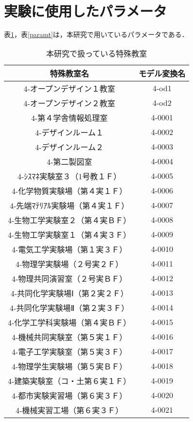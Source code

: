 \section{実験に使用したパラメータ}
\label{hurokupara}
表\ref{tokushu}，表\ref{paramt}は，本研究で用いているパラメータである．
\begin{table}[!h]
\begin{center}
\caption{本研究で扱っている特殊教室}
\label{tokushu}
\begin{tabular}{|c|c|}
\hline
特殊教室名 & モデル変換名\\
\hline\hline
4-オープンデザイン１教室          &   4-od1 \\
4-オープンデザイン２教室          &   4-od2 \\
4-第４学舎情報処理室              &   4-0001\\
4-デザインルーム１                &   4-0002\\
4-デザインルーム２                &   4-0003\\
4-第二製図室                      &   4-0004\\
4-ｼｽﾏﾈ実験室３（1号教１Ｆ）       &   4-0005\\
4-化学物質実験場（第４実１Ｆ）    &   4-0006\\
4-先端ﾏﾃﾘｱﾙ実験場（第４実１Ｆ）   &   4-0007\\
4-生物工学実験室２（第４実ＢＦ）  &   4-0008\\
4-生物工学実験室１（第４実３Ｆ）  &   4-0009\\
4-電気工学実験場（第１実３Ｆ）    &   4-0010\\
4-物理学実験場（２号実２Ｆ）      &   4-0011\\
4-物理共同演習室（２号実ＢＦ）    &   4-0012\\
4-共同化学実験場Ⅰ（第２実２Ｆ）  &   4-0013\\
4-共同化学実験場Ⅱ（第２実３Ｆ）  &   4-0014\\
4-化学工学科実験場（第４実ＢＦ）  &   4-0015\\
4-機械共同実験室（第５実１Ｆ）    &   4-0016\\
4-電子工学実験室（第５実３Ｆ）    &   4-0017\\
4-物理学生実験場（第５実ＢＦ）    &   4-0018\\
4-建築実験室（コ・土第６実１Ｆ）  &   4-0019\\
4-都市実験実習場（第６実３Ｆ）    &   4-0020\\
4-機械実習工場（第６実３Ｆ）      &   4-0021\\
\hline
\end{tabular}
\end{center}
\end{table}


